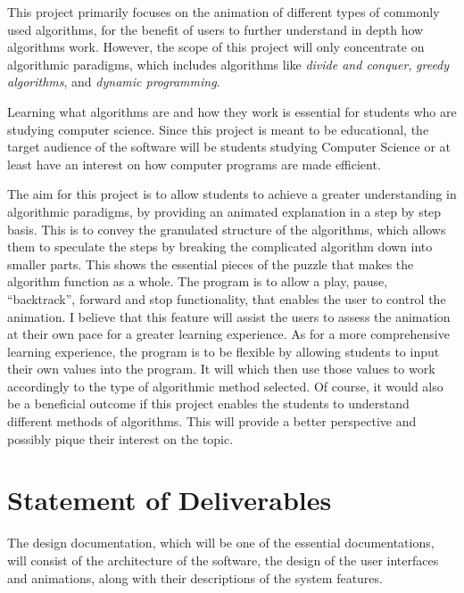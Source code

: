 \documentclass[12pt,a4paper,oneside]{report}
\begin{document}
This project primarily focuses on the animation of different types of commonly used algorithms, for the benefit of users to further understand in depth how algorithms work. However, the scope of this project will only concentrate on algorithmic paradigms, which includes algorithms like \textit{divide and conquer}, \textit{greedy algorithms}, and \textit{dynamic programming}.

Learning what algorithms are and how they work is essential for students who are studying computer science. Since this project is meant to be educational, the target audience of the software will be students studying Computer Science or at least have an interest on how computer programs are made efficient. 

The aim for this project is to allow students to achieve a greater understanding in algorithmic paradigms, by providing an animated explanation in a step by step basis. This is to convey the granulated structure of the algorithms, which allows them to speculate the steps by breaking the complicated algorithm down into smaller parts. This shows the essential pieces of the puzzle that makes the algorithm function as a whole. The program is to allow a play, pause, ``backtrack'', forward and stop functionality, that enables the user to control the animation. I believe that this feature will assist the users to assess the animation at their own pace for a greater learning experience. As for a more comprehensive learning experience, the program is to be flexible by allowing students to input their own values into the program. It will which then use those values to work accordingly to the type of algorithmic method selected. Of course, it would also be a beneficial outcome if this project enables the students to understand different methods of algorithms. This will provide a better perspective and possibly pique their interest on the topic.

\section*{Statement of Deliverables} 
The design documentation, which will be one of the essential documentations, will consist of the architecture of the software, the design of the user interfaces and animations, along with their descriptions of the system features. 
\end{document}
